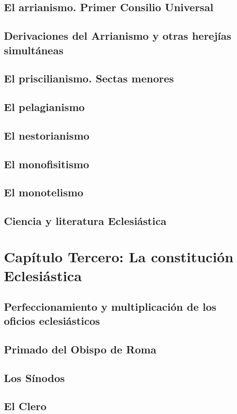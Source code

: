 \raggedbottom{} \documentclass[12pt, a4paper]{book}
\begin{document}
\section{El arrianismo. Primer Consilio Universal}
\section{Derivaciones del Arrianismo y otras herejías simultáneas}
\section{El priscilianismo. Sectas menores}
\section{El pelagianismo}
\section{El nestorianismo}
\section{El monofisitismo}
\section{El monotelismo}
\section{Ciencia y literatura Eclesiástica}
\chapter{Capítulo Tercero: La constitución Eclesiástica}
\section{Perfeccionamiento y multiplicación de los oficios eclesiásticos}
\section{Primado del Obispo de Roma}
\section{Los Sínodos}
\section{El Clero}
\end{document}
